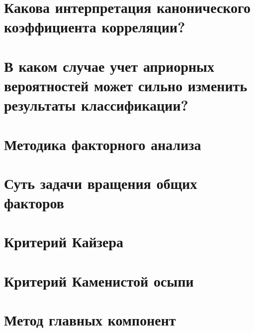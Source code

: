 \documentclass[a4paper, 12pt]{article}
\begin{document}
\section{Какова интерпретация канонического коэффициента корреляции?}
\section{В каком случае учет априорных вероятностей может сильно изменить результаты классификации?}
\section{Методика факторного анализа}
\section{Суть задачи вращения общих факторов}
\section{Критерий Кайзера}
\section{Критерий Каменистой осыпи}
\section{Метод главных компонент}
\end{document}
